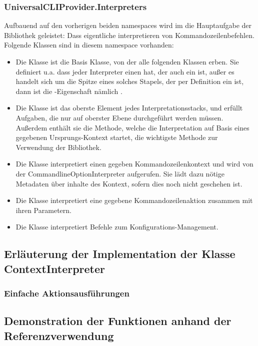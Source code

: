  \subsubsection{UniversalCLIProvider.Interpreters}
 Aufbauend auf den vorherigen beiden namespaces wird im  die Hauptaufgabe der Bibliothek geleistet: 
 Dass eigentliche interpretieren von Kommandozeilenbefehlen.
 Folgende Klassen sind in diesem namespace vorhanden:
 \begin{itemize}
  \item Die  Klasse ist die Basis Klasse, von der alle folgenden Klassen erben.
  Sie definiert u.a. dass jeder Interpreter einen  hat, der auch ein  ist, au\ss er es handelt sich um die Spitze eines solches Stapels,
  der per Definition ein  ist, dann ist die -Eigenschaft n\"amlich .
  \item Die  Klasse ist das oberste Element jedes Interpretationsstacks, und erf\"ullt Aufgaben, die nur auf oberster Ebene durchgef\"uhrt werden m\"ussen.
  Au\ss erdem enth\"alt sie die  Methode, welche die Interpretation auf Basis eines gegebenen Ursprungs-Kontext startet, die wichtigste Methode zur Verwendung der Bibliothek.
  \item Die  Klasse interpretiert einen gegeben Kommandozeilenkontext und wird von der CommandlineOptionInterpreter aufgerufen.
  Sie l\"adt dazu n\"otige Metadaten \"uber inhalte des Kontext, sofern dies noch nicht geschehen ist.
  \item Die  Klasse interpretiert eine gegebene Kommandozeilenaktion zusammen mit ihren Parametern.
  \item Die  Klasse interpretiert Befehle zum Konfigurations-Management.
 \end{itemize}
 \subsection{Erläuterung der Implementation der Klasse ContextInterpreter}\label{subsec:ConextInterpreter}
 \subsubsection{Einfache Aktionsausführungen}
 \subsection{Demonstration der Funktionen anhand der Referenzverwendung}\label{subsec:demonstration}
